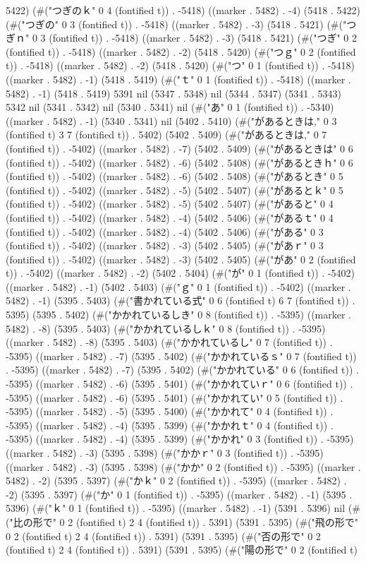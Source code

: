 5422) (#("つぎのｋ" 0 4 (fontified t)) . -5418) ((marker . 5482) . -4) (5418 . 5422) (#("つぎの" 0 3 (fontified t)) . -5418) ((marker . 5482) . -3) (5418 . 5421) (#("つぎｎ" 0 3 (fontified t)) . -5418) ((marker . 5482) . -3) (5418 . 5421) (#("つぎ" 0 2 (fontified t)) . -5418) ((marker . 5482) . -2) (5418 . 5420) (#("つｇ" 0 2 (fontified t)) . -5418) ((marker . 5482) . -2) (5418 . 5420) (#("つ" 0 1 (fontified t)) . -5418) ((marker . 5482) . -1) (5418 . 5419) (#("ｔ" 0 1 (fontified t)) . -5418) ((marker . 5482) . -1) (5418 . 5419) 5391 nil (5347 . 5348) nil (5344 . 5347) (5341 . 5343) 5342 nil (5341 . 5342) nil (5340 . 5341) nil (#("あ" 0 1 (fontified t)) . -5340) ((marker . 5482) . -1) (5340 . 5341) nil (5402 . 5410) (#("があるときは," 0 3 (fontified t) 3 7 (fontified t)) . 5402) (5402 . 5409) (#("があるときは," 0 7 (fontified t)) . -5402) ((marker . 5482) . -7) (5402 . 5409) (#("があるときは" 0 6 (fontified t)) . -5402) ((marker . 5482) . -6) (5402 . 5408) (#("があるときｈ" 0 6 (fontified t)) . -5402) ((marker . 5482) . -6) (5402 . 5408) (#("があるとき" 0 5 (fontified t)) . -5402) ((marker . 5482) . -5) (5402 . 5407) (#("があるとｋ" 0 5 (fontified t)) . -5402) ((marker . 5482) . -5) (5402 . 5407) (#("があると" 0 4 (fontified t)) . -5402) ((marker . 5482) . -4) (5402 . 5406) (#("があるｔ" 0 4 (fontified t)) . -5402) ((marker . 5482) . -4) (5402 . 5406) (#("がある" 0 3 (fontified t)) . -5402) ((marker . 5482) . -3) (5402 . 5405) (#("があｒ" 0 3 (fontified t)) . -5402) ((marker . 5482) . -3) (5402 . 5405) (#("があ" 0 2 (fontified t)) . -5402) ((marker . 5482) . -2) (5402 . 5404) (#("が" 0 1 (fontified t)) . -5402) ((marker . 5482) . -1) (5402 . 5403) (#("ｇ" 0 1 (fontified t)) . -5402) ((marker . 5482) . -1) (5395 . 5403) (#("書かれている式" 0 6 (fontified t) 6 7 (fontified t)) . 5395) (5395 . 5402) (#("かかれているしき" 0 8 (fontified t)) . -5395) ((marker . 5482) . -8) (5395 . 5403) (#("かかれているしｋ" 0 8 (fontified t)) . -5395) ((marker . 5482) . -8) (5395 . 5403) (#("かかれているし" 0 7 (fontified t)) . -5395) ((marker . 5482) . -7) (5395 . 5402) (#("かかれているｓ" 0 7 (fontified t)) . -5395) ((marker . 5482) . -7) (5395 . 5402) (#("かかれている" 0 6 (fontified t)) . -5395) ((marker . 5482) . -6) (5395 . 5401) (#("かかれていｒ" 0 6 (fontified t)) . -5395) ((marker . 5482) . -6) (5395 . 5401) (#("かかれてい" 0 5 (fontified t)) . -5395) ((marker . 5482) . -5) (5395 . 5400) (#("かかれて" 0 4 (fontified t)) . -5395) ((marker . 5482) . -4) (5395 . 5399) (#("かかれｔ" 0 4 (fontified t)) . -5395) ((marker . 5482) . -4) (5395 . 5399) (#("かかれ" 0 3 (fontified t)) . -5395) ((marker . 5482) . -3) (5395 . 5398) (#("かかｒ" 0 3 (fontified t)) . -5395) ((marker . 5482) . -3) (5395 . 5398) (#("かか" 0 2 (fontified t)) . -5395) ((marker . 5482) . -2) (5395 . 5397) (#("かｋ" 0 2 (fontified t)) . -5395) ((marker . 5482) . -2) (5395 . 5397) (#("か" 0 1 (fontified t)) . -5395) ((marker . 5482) . -1) (5395 . 5396) (#("ｋ" 0 1 (fontified t)) . -5395) ((marker . 5482) . -1) (5391 . 5396) nil (#("比の形で" 0 2 (fontified t) 2 4 (fontified t)) . 5391) (5391 . 5395) (#("飛の形で" 0 2 (fontified t) 2 4 (fontified t)) . 5391) (5391 . 5395) (#("否の形で" 0 2 (fontified t) 2 4 (fontified t)) . 5391) (5391 . 5395) (#("陽の形で" 0 2 (fontified t) 